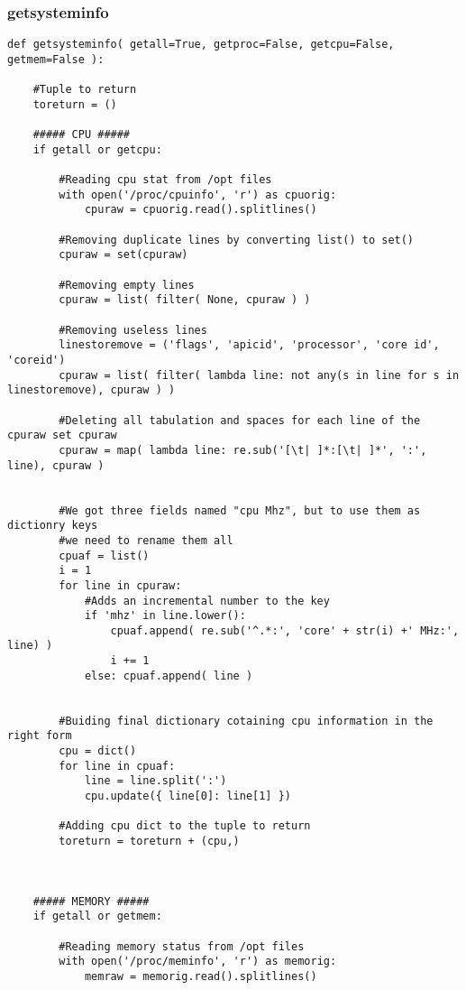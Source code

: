 \documentclass[11pt]{article}
\begin{document}
\subsubsection{getsysteminfo}\label{getsysteminfo}
\begin{lstlisting}
def getsysteminfo( getall=True, getproc=False, getcpu=False, getmem=False ):

    #Tuple to return
    toreturn = ()

    ##### CPU #####
    if getall or getcpu:

        #Reading cpu stat from /opt files
        with open('/proc/cpuinfo', 'r') as cpuorig:
            cpuraw = cpuorig.read().splitlines()

        #Removing duplicate lines by converting list() to set()
        cpuraw = set(cpuraw)
        
        #Removing empty lines
        cpuraw = list( filter( None, cpuraw ) )
    
        #Removing useless lines
        linestoremove = ('flags', 'apicid', 'processor', 'core id', 'coreid')
        cpuraw = list( filter( lambda line: not any(s in line for s in linestoremove), cpuraw ) )
    
        #Deleting all tabulation and spaces for each line of the cpuraw set cpuraw
        cpuraw = map( lambda line: re.sub('[\t| ]*:[\t| ]*', ':', line), cpuraw )
    
    
        #We got three fields named "cpu Mhz", but to use them as dictionry keys
        #we need to rename them all
        cpuaf = list()
        i = 1
        for line in cpuraw:
            #Adds an incremental number to the key
            if 'mhz' in line.lower():
                cpuaf.append( re.sub('^.*:', 'core' + str(i) +' MHz:', line) )
                i += 1
            else: cpuaf.append( line )
    
    
        #Buiding final dictionary cotaining cpu information in the right form
        cpu = dict()
        for line in cpuaf:
            line = line.split(':')
            cpu.update({ line[0]: line[1] })

        #Adding cpu dict to the tuple to return
        toreturn = toreturn + (cpu,)



    ##### MEMORY #####
    if getall or getmem:

        #Reading memory status from /opt files
        with open('/proc/meminfo', 'r') as memorig:
            memraw = memorig.read().splitlines()



\end{lstlisting}
\end{document}
